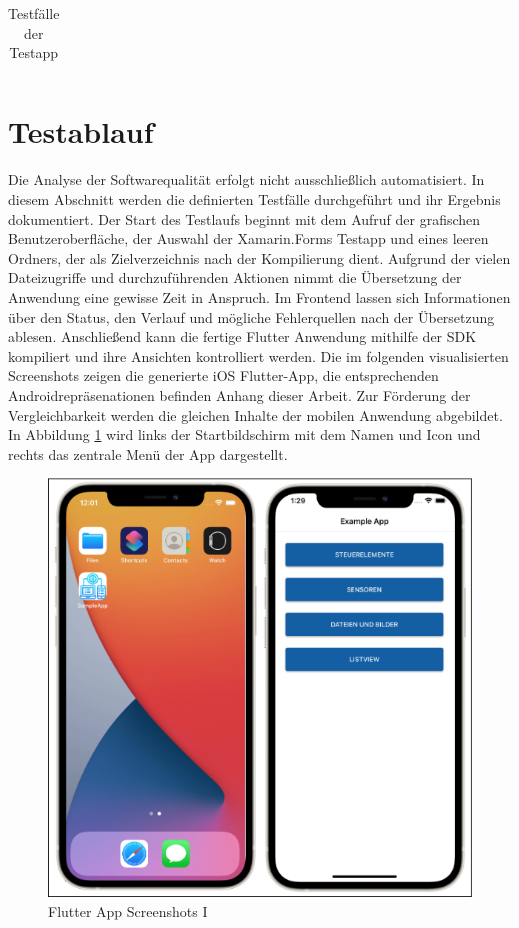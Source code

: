 \begin{xltabular}{\textwidth}{|l|X|}
	  \caption{Testfälle der Testapp}

 \label{tab:Testapp}
\end{xltabular}


\section{Testablauf}
Die Analyse der Softwarequalität erfolgt nicht ausschließlich automatisiert.  In diesem Abschnitt werden die definierten Testfälle durchgeführt und ihr Ergebnis dokumentiert.
Der Start  des Testlaufs beginnt mit dem Aufruf der grafischen Benutzeroberfläche,   der Auswahl der Xamarin.Forms Testapp und eines leeren Ordners, der als Zielverzeichnis nach der Kompilierung dient. 
Aufgrund der vielen Dateizugriffe und durchzuführenden Aktionen nimmt die Übersetzung der Anwendung eine gewisse Zeit in Anspruch. Im Frontend lassen sich Informationen über den Status, den Verlauf und mögliche Fehlerquellen nach der Übersetzung ablesen.  Anschließend kann die fertige Flutter Anwendung mithilfe der SDK kompiliert und ihre Ansichten kontrolliert werden.  Die im folgenden visualisierten Screenshots zeigen die generierte iOS Flutter-App,  die entsprechenden Androidrepräsenationen befinden Anhang dieser Arbeit.  Zur Förderung der Vergleichbarkeit werden die gleichen Inhalte der mobilen Anwendung abgebildet.  In Abbildung \ref{fig:FlutterAppI} wird links der Startbildschirm mit dem Namen und Icon und rechts das zentrale Menü der App dargestellt. 

\begin{figure}[!ht]
 \includegraphics[width=\textwidth,keepaspectratio]{Images/Screenshot/AppIconAndMenu.png}
 \caption{Flutter App Screenshots I}
 \label{fig:FlutterAppI}
\end{figure}

